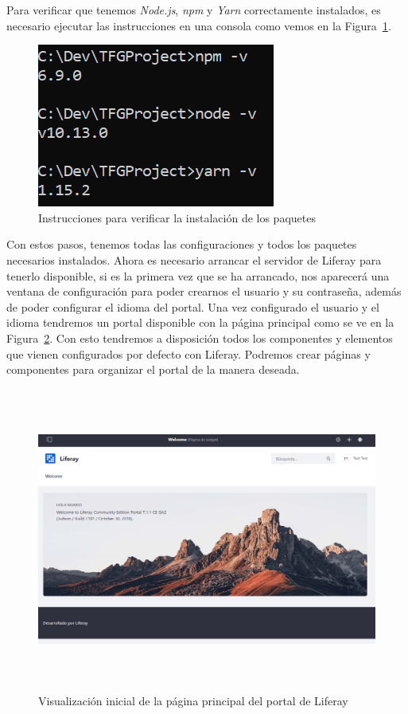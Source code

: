 \documentclass[a4paper, 12pt]{book}
\begin{document}
\vspace{5mm}
Para verificar que tenemos \textit{Node.js}, \textit{npm} y \textit{Yarn} correctamente instalados, es necesario ejecutar las instrucciones en una consola como vemos en la Figura~\ref{fig:verificacion}.
\begin{figure}
  \centering
  \includegraphics{img_usadas/verificacion.png}
  \caption{Instrucciones para verificar la instalación de los paquetes}
  \label{fig:verificacion}
\end{figure}

\vspace{20mm}
Con estos pasos, tenemos todas las configuraciones y todos los paquetes necesarios instalados. Ahora es necesario arrancar el servidor de Liferay para tenerlo disponible, si es la primera vez que se ha arrancado, nos aparecerá una ventana de configuración para poder crearnos el usuario y su contraseña, además de poder configurar el idioma del portal. Una vez configurado el usuario y el idioma tendremos un portal disponible con la página principal como se ve en la Figura~\ref{fig:liferay_ini}. Con esto tendremos a disposición todos los componentes y elementos que vienen configurados por defecto con Liferay. Podremos crear páginas y componentes para organizar el portal de la manera deseada.
\begin{figure}[h]
  \centering
  \includegraphics[width=15cm, height=10cm]{img_usadas/liferay_ini.png}
  \caption{Visualización inicial de la página principal del portal de Liferay}
  \label{fig:liferay_ini}
\end{figure}
\end{document}
